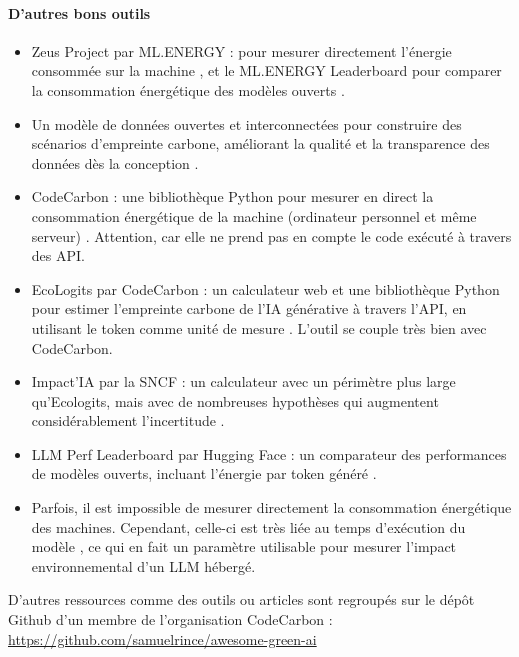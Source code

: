 \paragraph{D'autres bons outils}
\begin{itemize}
\item Zeus Project par ML.ENERGY : pour mesurer directement l'énergie consommée sur la machine \cite{zeus-nsdi23}, et le ML.ENERGY Leaderboard pour comparer la consommation énergétique des modèles ouverts \cite{MLENERGY}.

\item Un modèle de données ouvertes et interconnectées pour construire des scénarios d'empreinte carbone, améliorant la qualité et la transparence des données dès la conception \cite{ruf2023openlinkeddatamodel}.

\item CodeCarbon : une bibliothèque Python pour mesurer en direct la consommation énergétique de la machine (ordinateur personnel et même serveur) \cite{courty2026codecarbon}. Attention, car elle ne prend pas en compte le code exécuté à travers des API.

\item EcoLogits par CodeCarbon : un calculateur web et une bibliothèque Python pour estimer l'empreinte carbone de l'IA générative à travers l'API, en utilisant le token comme unité de mesure \cite{ecologits_calculator}. L'outil se couple très bien avec CodeCarbon.

\item Impact'IA par la SNCF : un calculateur avec un périmètre plus large qu'Ecologits, mais avec de nombreuses hypothèses qui augmentent considérablement l’incertitude \cite{sncf_impactia_2026}.

\item LLM Perf Leaderboard par Hugging Face : un comparateur des performances de modèles ouverts, incluant l'énergie par token généré \cite{huggingface_llm_perf_leaderboard}.

\item Parfois, il est impossible de mesurer directement la consommation énergétique des machines. Cependant, celle-ci est très liée au temps d'exécution du modèle \cite{Zschache2026}, ce qui en fait un paramètre utilisable pour mesurer l'impact environnemental d'un LLM hébergé.
\end{itemize}

\item D'autres ressources comme des outils ou articles sont regroupés sur le dépôt Github \cite{rince_awesome_green_ai} d'un membre de l'organisation CodeCarbon : \url{https://github.com/samuelrince/awesome-green-ai}
